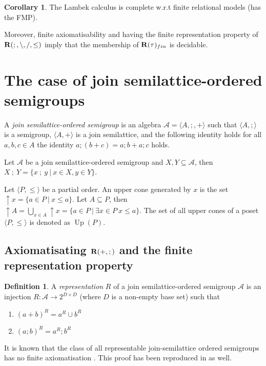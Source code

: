 \documentclass[a4paper]{article}
\theoremstyle{definition}
\newtheorem{definition}{Definition}
\theoremstyle{theorem}
\theoremstyle{proposition}
\theoremstyle{lemma}
\theoremstyle{ex}
\theoremstyle{corollary}
\newtheorem{corollary}{Corollary}
\theoremstyle{claim}
\begin{document}
\begin{corollary} \label{fmp}
  The Lambek calculus is complete w.r.t finite relational models (has the FMP).
\end{corollary}

Moreover, finite axiomatisability and having the finite representation property of ${\bf R}(;, \setminus, /, \leq)$ imply that the membership of ${\bf R}(\tau)_{fin}$ is decidable.

\section{The case of join semilattice-ordered semigroups}

A \emph{join semilattice-ordered semigroup} is an algebra $\mathcal{A} = \langle A, ;, + \rangle$ such that $\langle A, ; \rangle$ is a semigroup, $\langle A, + \rangle$ is a join semilattice, and the following identity holds for all $a, b, c \in A$ the identity $a ; (b + c) = a ; b + a ; c$ holds.

Let $\mathcal{A}$ be a join semilattice-ordered semigroup and $X, Y \subseteq \mathcal{A}$, then $X \: ; \: Y = \{ x \: ; \: y \: | \: x \in X, y \in Y \}$.

Let $\langle P, \leq \rangle$ be a partial order. An upper cone generated by $x$ is the set $\uparrow x = \{ a \in P \: | \: x \leq a \}$. Let $A \subseteq P$, then $\uparrow A = \bigcup \limits_{x \in A} \uparrow x = \{ a \in P \: | \: \exists x \in P \: x \leq a \}$. The set of all upper cones of a poset $\langle P, \leq \rangle$ is denoted as $\operatorname{Up}(P)$.

\subsection{Axiomatisating ${\bf R}(+, ;)$ and the finite representation property}

\begin{definition}
  A \emph{representation} $R$ of a join semilattice-ordered semigroup $\mathcal{A}$
  is an injection $R : \mathcal{A} \to 2^{D \times D}$ (where $D$ is a non-empty base set) such that
  \begin{enumerate}
    \item $(a + b)^R = a^R \cup b^R$
    \item $(a ; b)^R = a^R ; b^R$
  \end{enumerate}
\end{definition}

It is known that the class of all representable join-semilattice ordered semigroups has no finite axiomatisation \cite{andreka1989union}. This proof has been reproduced in \cite{andreka2011axiomatizability} as well.
\end{document}
